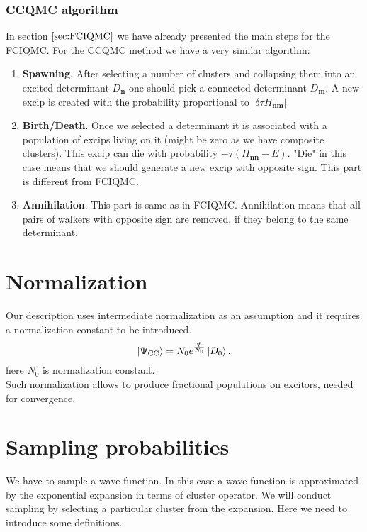 \documentclass[twoside,english]{uiofysmaster}
\theoremstyle{definition}
\begin{document}
\subsubsection{CCQMC algorithm}
In section $\ref{sec:FCIQMC}$ we have already presented the main steps for the FCIQMC. For the CCQMC method we have a very similar algorithm:
\begin{enumerate}
	\item \textbf{Spawning}. After selecting a number of clusters and collapsing them into an excited determinant $D_{\textbf{n}}$ one should pick a connected determinant   $D_{\textbf{m}}$. A new excip is created with the probability proportional to $|\delta \tau H_{\textbf{nm}}|$. 
	\item \textbf{Birth/Death}. Once we selected a determinant it is associated  with a population of excips living on it (might be zero as we have composite clusters). This excip can die with probability $- \tau (H_{\textbf{nn}} - E)$. "Die" in this case means that we should generate a new excip with opposite sign. This part is different from FCIQMC. 
	\item \textbf{Annihilation}. This part is same as in FCIQMC. Annihilation means that all pairs of walkers with opposite sign are removed, if they belong to the same determinant.
\end{enumerate}

\section{Normalization}
Our description uses intermediate normalization as an assumption and it requires a normalization constant to be introduced. 
\begin{equation}
\ket{\Psi_{\text{CC}}}=N_0 e^{\frac{\hat{T}}{N_0}} \ket{D_0}.
\end{equation}
here $N_0$ is normalization constant.\\
Such normalization allows to produce fractional populations on excitors, needed for convergence. 
\section{Sampling probabilities}

We have to sample a wave function. In this case a wave function is approximated by the exponential expansion in terms of cluster operator. We will conduct sampling by selecting a particular cluster from the expansion. Here we need to introduce some definitions.\\
\end{document}

